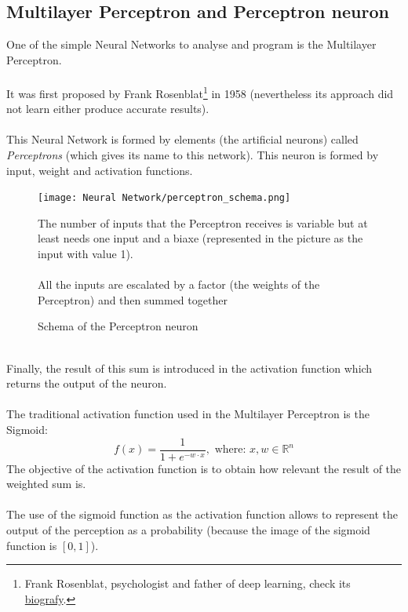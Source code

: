 \documentclass[a4paper, 11pt]{article}
\begin{document}
\subsection{Multilayer Perceptron and Perceptron neuron}
One of the simple Neural Networks to analyse and program is the Multilayer Perceptron.\\\\
It was first proposed by Frank Rosenblat\footnote{Frank Rosenblat, psychologist and father of deep learning, check its \href{https://en.wikipedia.org/wiki/Frank_Rosenblat}{biografy}.} in 1958 (nevertheless its approach did not learn either produce accurate results).\\\\
This Neural Network is formed by elements (the artificial neurons) called \textit{Perceptrons} (which gives its name to this network). This neuron is formed by input, weight and activation functions.
\begin{figure}[h]
    \begin{minipage}{9cm}
       \begin{center}
           \texttt{[image: Neural Network/perceptron\_schema.png]}
           \caption{Schema of the Perceptron neuron}
       \end{center} 
    \end{minipage}
    \hspace{1em}
    \begin{minipage}{5cm}
        The number of inputs that the Perceptron receives is variable but at least needs one input and a biaxe (represented in the picture as the input with value 1).\\\\
        All the inputs are escalated by a factor (the weights of the Perceptron) and then summed together
    \end{minipage}
\end{figure}\\
 Finally, the result of this sum is introduced in the activation function which returns the output of the neuron.\\\\
The traditional activation function used in the Multilayer Perceptron is the Sigmoid: 
$$f(x) = \frac{1}{1+e^{-w\cdot x}},\text{ where: } x,w\in\mathbb{R}^n$$
The objective of the activation function is to obtain how relevant the result of the weighted sum is.\\\\
The use of the sigmoid function as the activation function allows to represent the output of the perception as a probability (because the image of the sigmoid function is $[0,1]$).\newpage
\end{document}
